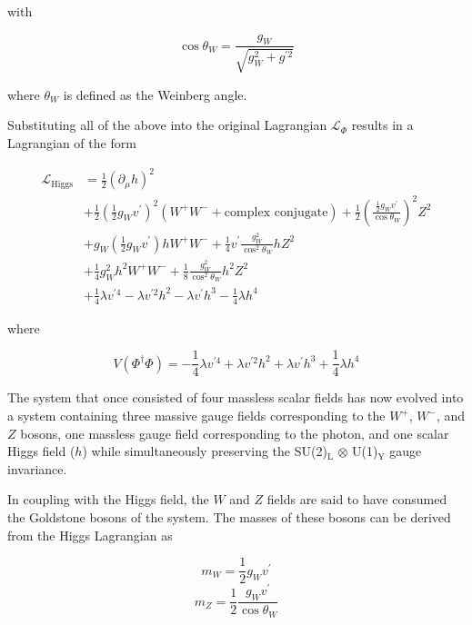\documentclass[12pt,a4paper,epsf,portrait,times,epsfig]{report}
\begin{document}
	with 

	\begin{equation}
		\cos\theta_{W} = \frac{g_{W}}{\sqrt{g^{2}_{W}+g^{\prime 2}}}
	\end{equation}

	where $\theta_{W}$ is defined as the Weinberg angle. 

	Substituting all of the above into the original Lagrangian $\mathcal{L}_{\Phi}$ results in a Lagrangian of the form

	\begin{equation}
		\begin{split}
			\mathcal{L}_{\mathrm{Higgs}} &= \frac{1}{2}(\partial_{\mu}h)^{2} \\
			&+\frac{1}{2}\left(\frac{1}{2}g_{W}v^{\prime}\right)^{2}(W^{+}W^{-}+\text{complex conjugate})+\frac{1}{2}\left(\frac{\frac{1}{2}g_{W}v^{\prime}}{\cos\theta_{W}}\right)^{2}Z^{2} \\
			&+g_{W}\left(\frac{1}{2}g_{W}v^{\prime}\right)hW^{+}W^{-}+\frac{1}{4}v^{\prime}\frac{g^{2}_{W}}{\cos^{2}\theta_{W}}hZ^{2} \\
			&+\frac{1}{4}g^{2}_{W}h^{2}W^{+}W^{-} + \frac{1}{8}\frac{g^{2}_{W}}{\cos^{2}\theta_{W}}h^{2}Z^{2} \\
			&+\frac{1}{4}\lambda v^{\prime 4} - \lambda v^{\prime 2}h^{2} - \lambda v^{\prime}h^{3} - \frac{1}{4}\lambda h^{4}
		\end{split}
	\end{equation}

	where

	\begin{equation}
		V(\Phi^{\dagger}\Phi) = -\frac{1}{4}\lambda v^{\prime 4} + \lambda v^{\prime 2}h^{2} + \lambda v^{\prime}h^{3} + \frac{1}{4}\lambda h^{4}
	\end{equation}

	The system that once consisted of four massless scalar fields has now evolved into a system containing three massive gauge fields corresponding to the $W^{+}$, $W^{-}$, and $Z$ bosons, one massless gauge field corresponding to the photon, and one scalar Higgs field ($h$) while simultaneously preserving the SU(2)$_{\mathrm{L}}$ $\otimes$ U(1)$_{\mathrm{Y}}$ gauge invariance. \par
	
	In coupling with the Higgs field, the $W$ and $Z$ fields are said to have consumed the Goldstone bosons of the system. The masses of these bosons can be derived from the Higgs Lagrangian as

	\begin{equation}
		m_{W} = \frac{1}{2}g_{W}v^{\prime}
	\end{equation}
	\begin{equation}
		m_{Z} = \frac{1}{2}\frac{g_{W}v^{\prime}}{\cos\theta_{W}}
	\end{equation}
\end{document}
